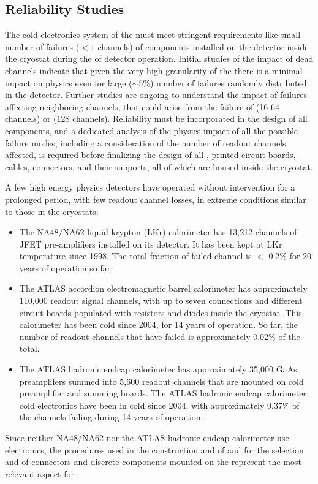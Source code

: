 \subsection{Reliability Studies}
\label{sec:fdsp-tpcelec-qa-reliability}

The  cold electronics system of the    must meet 
stringent requirements like small number of failures ($<\num{1}$%
channels) of components installed 
on the detector inside the cryostat during the \dunelifetime of 
detector operation. Initial studies of the impact of dead channels indicate
that given the very high granularity of the  there is a minimal
impact on physics even for large ($\sim5$\%) number of failures randomly distributed
in the detector. Further studies are ongoing to understand the impact of failures 
affecting neighboring channels, that could arise from the failure of  
(16-64 channels) or  (128 channels). Reliability must be incorporated in the 
design of all components, and a dedicated analysis of the physics impact of all the 
possible failure modes, including a consideration of the number of readout channels
affected, is required before finalizing the design of all , printed circuit 
boards, cables, connectors, and their supports, all of which are housed inside the 
  cryostat. 

A few high energy physics detectors have operated without intervention for a 
prolonged period, with few readout channel losses, in extreme 
conditions similar to those in the  cryostats:
\begin{itemize}
\item The NA48/NA62 liquid krypton (LKr) calorimeter has 13,212 channels 
of JFET pre-amplifiers installed on its detector. It has been kept at LKr temperature 
since 1998. The total fraction of failed channel is $<$ 0.2\% for 20 years of operation so far.
\item The ATLAS  accordion electromagnetic barrel calorimeter has 
approximately 110,000 readout signal channels, with up to seven connections and different 
circuit boards populated with resistors and diodes inside the cryostat. This
calorimeter has been cold since 2004, for 14 years of operation. So far, the
number of readout channels that have failed is approximately 0.02\% of the total.
\item The ATLAS  hadronic endcap calorimeter has approximately 35,000 GaAs
preamplifers summed into 5,600 readout channels that are mounted on cold preamplifier
and summing boards. The ATLAS  hadronic endcap 
calorimeter cold electronics have been in cold since 2004, with approximately 
0.37\% of the channels failing during 14 years of operation. 
\end{itemize}
Since neither NA48/NA62 nor the ATLAS  hadronic endcap calorimeter
use  electronics, the procedures used in the construction and  of  and 
for the selection and  of connectors and discrete components mounted
on the  represent the most relevant aspect for .

